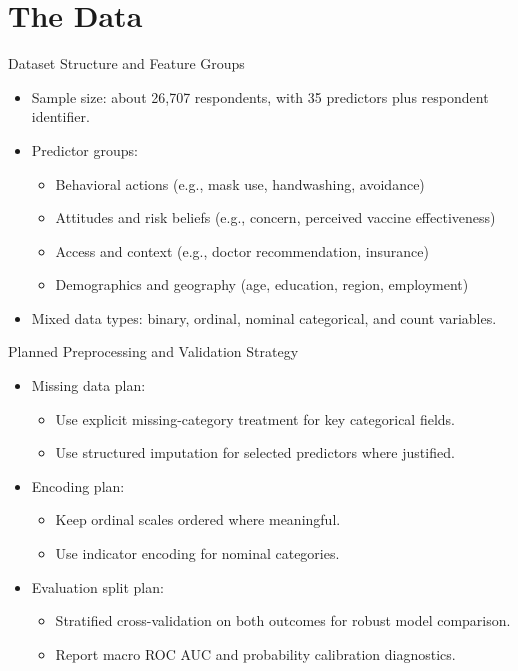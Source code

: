 \section{The Data}

\begin{frame}{Dataset Structure and Feature Groups}
	\begin{itemize}
		\item Sample size: about 26,707 respondents, with 35 predictors plus respondent identifier.
		\item Predictor groups:
		\begin{itemize}
			\item Behavioral actions (e.g., mask use, handwashing, avoidance)
			\item Attitudes and risk beliefs (e.g., concern, perceived vaccine effectiveness)
			\item Access and context (e.g., doctor recommendation, insurance)
			\item Demographics and geography (age, education, region, employment)
		\end{itemize}
		\item Mixed data types: binary, ordinal, nominal categorical, and count variables.
	\end{itemize}
\end{frame}

\begin{frame}{Planned Preprocessing and Validation Strategy}
	\begin{itemize}
		\item Missing data plan:
		\begin{itemize}
			\item Use explicit missing-category treatment for key categorical fields.
			\item Use structured imputation for selected predictors where justified.
		\end{itemize}
		\item Encoding plan:
		\begin{itemize}
			\item Keep ordinal scales ordered where meaningful.
			\item Use indicator encoding for nominal categories.
		\end{itemize}
		\item Evaluation split plan:
		\begin{itemize}
			\item Stratified cross-validation on both outcomes for robust model comparison.
			\item Report macro ROC AUC and probability calibration diagnostics.
		\end{itemize}
	\end{itemize}
\end{frame}

